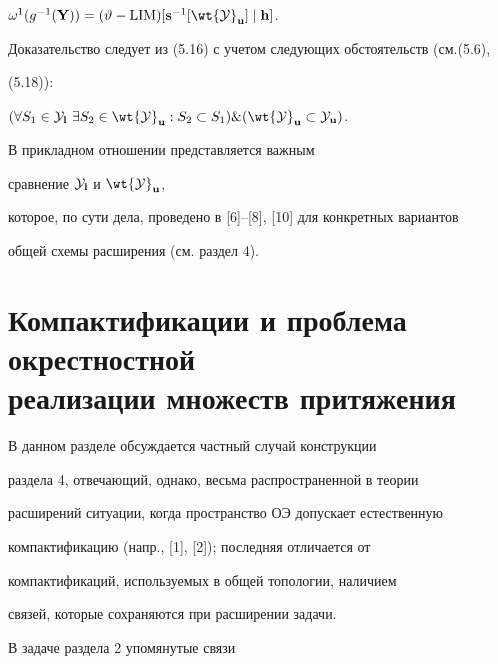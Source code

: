 \begin{props}


${{\omega}^1}({g^{-1}}({\bold Y})) = (\vt - {\LIM})[{{\bold s}^{-1}}[{\wt


{\cal Y}}_{\bold u}] \mid {\bold h}]$.


\end{props}





Доказательство следует из (5.16) с учетом следующих обстоятельств (см.(5.6),


(5.18)):


$(\fo{S_1} \in {{\cal Y}_{\bold l}}\ \exi{S_2}


\in {{\wt {\cal Y}}_{\bold u}}:


{S_2} \subset {S_1}) \& ({{\wt {\cal Y}}_{\bold u}} \subset


{{\cal Y}_{\bold u}})$.





В прикладном отношении представляется важным


сравнение ${\cal Y}_{\bold l}$ и ${\wt {\cal Y}}_{\bold u}$,


которое, по сути дела, проведено в [6]--[8], [10] для конкретных вариантов


общей схемы расширения (см. раздел 4).





\section{Компактификации и проблема окрестностной\protect\\


реализации множеств притяжения} 





В данном разделе обсуждается частный случай конструкции


раздела 4, отвечающий, однако, весьма распространенной в теории


расширений ситуации, когда пространство ОЭ допускает естественную


компактификацию (напр., [1], [2]); последняя отличается от


компактификаций, используемых в общей топологии, наличием


связей, которые сохраняются при расширении задачи.


В задаче раздела 2 упомянутые связи


